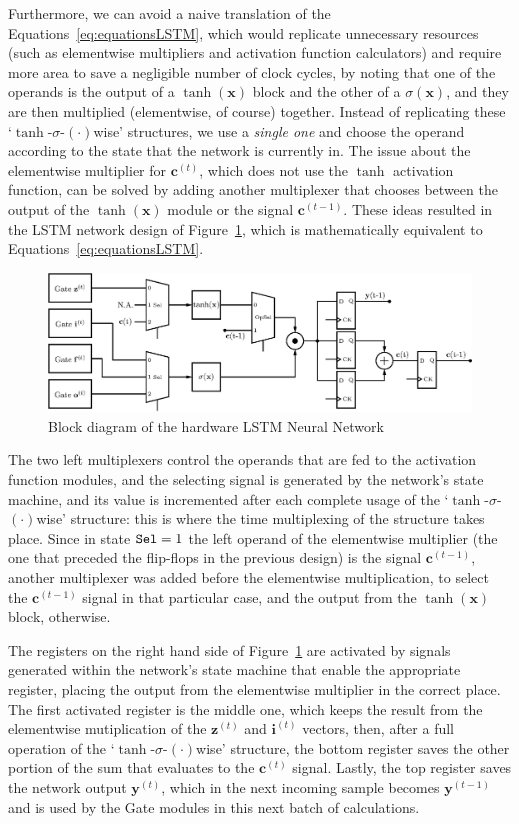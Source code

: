 \documentclass{IEEEtran}
\newcommand{\mb}[1]{\mathbf{#1}}
\begin{document}
Furthermore, we can avoid a naive translation of the Equations~\ref{eq:equationsLSTM}, which would replicate unnecessary resources (such as elementwise multipliers
and activation function calculators) and require more area to save a negligible number of clock cycles, by noting that one of the operands is the output
of a $\tanh(\mb{x})$ block and the other of a $\sigma(\mb{x})$, and they are then multiplied (elementwise, of course) together. Instead of replicating
these `$\tanh$-$\sigma$-$(\cdot)$wise' structures, we use a \emph{single one} and choose the operand according to the state that the network is currently in. The
issue about the elementwise multiplier for $\mb{c}^{(t)}$, which does not use the $\tanh$ activation function, can be solved by adding another multiplexer that chooses
between the output of the $\tanh(\mb{x})$ module or the signal $\mb{c}^{(t-1)}$. These ideas resulted in the LSTM network design of Figure~\ref{fig:network-opt}, which
is mathematically equivalent to Equations~\ref{eq:equationsLSTM}.

\begin{figure}
    \centering
    \includegraphics[width=0.9\linewidth]{figures/network-opt.eps}
    \caption[Block diagram of the hardware LSTM Neural Network]{Block diagram of the hardware LSTM Neural Network}
    \label{fig:network-opt}
\end{figure}
The two left multiplexers control the operands that are fed to the activation function modules, and the selecting signal is generated by the network's state machine,
and its value is incremented after each complete usage of the `$\tanh$-$\sigma$-$(\cdot)$wise' structure: this is where the time multiplexing of the structure takes place.
Since in state $\verb+Sel+=1$ the left operand of the elementwise multiplier (the one that preceded the flip-flops in the previous design) is the signal $\mb{c}^{(t-1)}$,
another multiplexer was added before the elementwise multiplication, to select the $\mb{c}^{(t-1)}$ signal in that particular case, and the output from the $\tanh(\mb{x})$ block, otherwise.

The registers on the right hand side of Figure~\ref{fig:network-opt} are activated by signals generated within the network's state machine that enable the appropriate register, placing the
output from the elementwise multiplier in the correct place. The first activated register is the middle one, which keeps the result from the elementwise mutiplication of the $\mb{z}^{(t)}$
and $\mb{i}^{(t)}$ vectors, then, after a full operation of the `$\tanh$-$\sigma$-$(\cdot)$wise' structure, the bottom register saves the other portion of the sum that evaluates to the $\mb{c}^{(t)}$
signal. Lastly, the top register saves the network output $\mb{y}^{(t)}$, which in the next incoming sample becomes $\mb{y}^{(t-1)}$ and is used by the Gate modules in this next batch of calculations.
\end{document}

